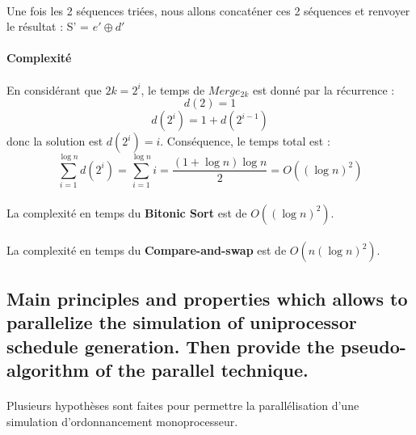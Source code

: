 \paragraph{}
Une fois les 2 séquences triées, nous allons concaténer ces 2 séquences et renvoyer le résultat :
S' = $e' \oplus d'$

\paragraph{}
\textbf{Complexité}
\paragraph{}
En considérant que $2k = 2^i$, le temps de $Merge_{2k}$ est donné par la récurrence :
\[d(2) = 1\]
\[d(2^{i}) = 1 + d(2^{i-1}) \]
donc la solution est $d(2^i) = i$. Conséquence, le temps total est :
\[ \sum^{\log{n}}_{i = 1} d(2^i) = \sum^{\log{n}}_{i = 1}i = \frac{(1+\log{n})\log{n}}{2} = O((\log{n})^2)\]
\paragraph{}
La complexité en temps du \textbf{Bitonic Sort} est de $O((\log{n})^2)$.
\paragraph{}
La complexité en temps du \textbf{Compare-and-swap} est de $O(n(\log{n})^2)$.

\subsection{Main principles and properties which allows to parallelize the simulation of uniprocessor schedule generation. Then provide the pseudo-algorithm of the parallel technique.}
\paragraph{}
Plusieurs hypothèses sont faites pour permettre la parallélisation d'une simulation d'ordonnancement monoprocesseur. 
